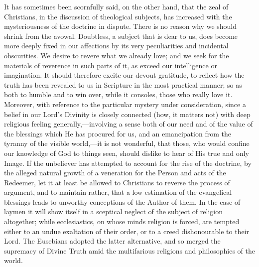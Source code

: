 It has sometimes been scornfully said, on the other hand, that the
zeal of Christians, in the discussion of theological subjects, has
increased with the mysteriousness of the doctrine in dispute. There is
no reason why we should shrink from the avowal. Doubtless, a subject
that is dear to us, does become more deeply fixed in our affections by
its very peculiarities and incidental obscurities. We desire to revere
what we already love; and we seek for the materials of reverence in
such parts of it, as exceed our intelligence or imagination. It should
therefore excite our devout gratitude, to reflect how the truth has
been revealed to us in Scripture in the most practical manner; so as
both to humble and to win over, while it consoles, those who really
love it. Moreover, with reference to the particular mystery under
consideration, since a belief in our Lord's Divinity is closely
connected (how, it matters not) with deep religious feeling generally,—involving
a sense both of our need and of the value of the blessings which He
has procured for us, and an emancipation from the tyranny of the
visible world,—it is not wonderful, that those, who would confine
our knowledge of God to things seen, should dislike to hear of His
true and only Image. If the unbeliever has attempted to account for
the rise of the doctrine, by the alleged natural growth of a
veneration for the Person and acts of the Redeemer, let it at least be
allowed to Christians to reverse the process of argument, and to
maintain rather, that a low estimation of the evangelical blessings
leads to unworthy conceptions of the Author of them. In the case of
laymen it will show itself in a sceptical neglect of the subject of
religion altogether; while ecclesiastics, on whose minds
religion is forced, are tempted either to an undue exaltation of their
order, or to a creed dishonourable to their Lord. The Eusebians
adopted the latter alternative, and so merged the supremacy of Divine
Truth amid the multifarious religions and philosophies of the world.

